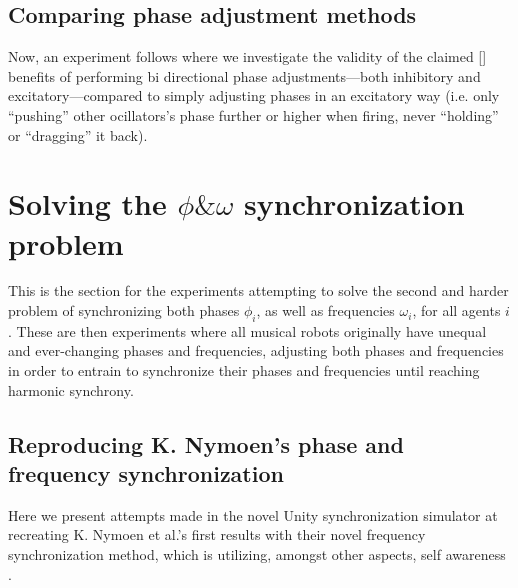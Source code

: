 	
	\subsection{Comparing phase adjustment methods}
	Now, an experiment follows where we investigate the validity of the claimed [] benefits of performing bi directional phase adjustments—both inhibitory and excitatory—compared to simply adjusting phases in an excitatory way (i.e. only ``pushing'' other ocillators's phase further or higher when firing, never ``holding'' or ``dragging'' it back).
	
	
	
	
\section{Solving the $\phi \& \omega$ synchronization problem}
This is the section for the experiments attempting to solve the second and harder problem of synchronizing both phases $\phi_i$, as well as frequencies $\omega_i$, for all agents $i$. These are then experiments where all musical robots originally have unequal and ever-changing phases  and frequencies, adjusting both phases and frequencies in order to entrain to synchronize their phases and frequencies until reaching harmonic synchrony.

	\subsection{Reproducing K. Nymoen's phase and frequency synchronization}
		Here we present attempts made in the novel Unity synchronization simulator at recreating K. Nymoen et al.'s first results with their novel frequency synchronization method, which is utilizing, amongst other aspects, self awareness \cite{nymoen_synch}.
		
